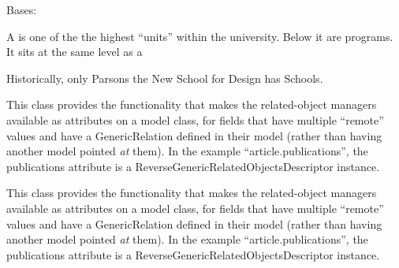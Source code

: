 \documentclass[letterpaper,10pt,english]{sphinxmanual}
\begin{document}
\begin{fulllineitems}
\label{generated/apps.profiles.models:apps.profiles.models.School}
Bases: {\hyperref[generated/apps.profiles.models:apps.profiles.models.BaseModel]{}}

A  is one of the the highest ``units'' within the university.  
Below it are programs.  It sits at the same level as a 

Historically, only Parsons the New School for Design has Schools.


\begin{fulllineitems}
\label{generated/apps.profiles.models:apps.profiles.models.School.authorities}
This class provides the functionality that makes the related-object
managers available as attributes on a model class, for fields that have
multiple ``remote'' values and have a GenericRelation defined in their model
(rather than having another model pointed \emph{at} them). In the example
``article.publications'', the publications attribute is a
ReverseGenericRelatedObjectsDescriptor instance.

\end{fulllineitems}



\begin{fulllineitems}
\label{generated/apps.profiles.models:apps.profiles.models.School.unit_permissions}
This class provides the functionality that makes the related-object
managers available as attributes on a model class, for fields that have
multiple ``remote'' values and have a GenericRelation defined in their model
(rather than having another model pointed \emph{at} them). In the example
``article.publications'', the publications attribute is a
ReverseGenericRelatedObjectsDescriptor instance.

\end{fulllineitems}


\end{fulllineitems}


\end{document}
